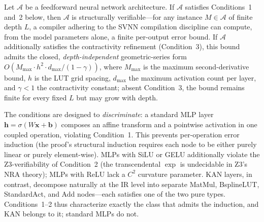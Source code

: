 \setcounter{theorem}{1}
\begin{theorem}
\label{thm:svnn_conditions}
Let $\mathcal{A}$ be a feedforward neural network architecture. If $\mathcal{A}$
satisfies Conditions~1 and~2 below, then $\mathcal{A}$ is structurally
verifiable---for any instance $M \in \mathcal{A}$ of finite depth $L$, a
compiler adhering to the SVNN compilation discipline can compute, from the
model parameters alone, a finite per-output error bound. If $\mathcal{A}$
additionally satisfies the contractivity refinement (Condition~3), this bound
admits the closed, \textit{depth-independent} geometric-series form
$O(M_{\max} \cdot h^2 \cdot d_{\max} / (1-\gamma))$, where $M_{\max}$ is the
maximum second-derivative bound, $h$ is the LUT grid spacing, $d_{\max}$ the
maximum activation count per layer, and $\gamma < 1$ the contractivity
constant; absent Condition~3, the bound remains finite for every fixed $L$
but may grow with depth.

The conditions are designed to \textit{discriminate}: a standard MLP layer
$\mathbf{h} = \sigma(W\mathbf{x} + \mathbf{b})$ composes an affine transform
and a pointwise activation in one coupled operation, violating Condition~1.
This prevents per-operation error induction (the proof's structural induction
requires each node to be either purely linear or purely element-wise).
MLPs with SiLU or GELU additionally violate the Z3-verifiability of
Condition~2 (the transcendental $\exp$ is undecidable in Z3's NRA theory);
MLPs with ReLU lack a $C^2$ curvature parameter. KAN layers, in contrast,
decompose naturally at the IR level into separate MatMul, BsplineLUT,
StandardAct, and Add nodes---each satisfies one of the two pure types.
Conditions~1--2 thus characterize exactly the class that admits the
induction, and KAN belongs to it; standard MLPs do not.
\end{theorem}

